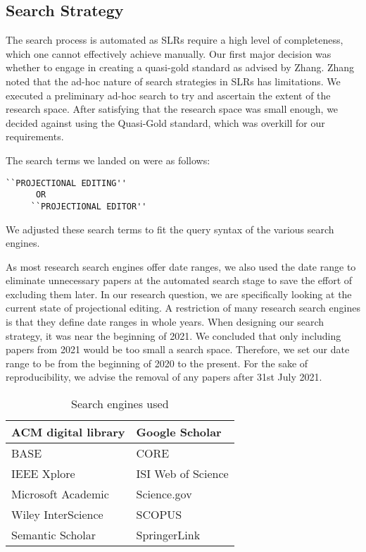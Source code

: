 \subsection{Search Strategy}

The search process is automated as SLRs require a high level of completeness, which one cannot effectively achieve manually.
Our first major decision was whether to engage in creating a quasi-gold standard as advised by Zhang\cite{Zhang_2011}.
Zhang noted that the ad-hoc nature of search strategies in SLRs has limitations.
We executed a preliminary ad-hoc search to try and ascertain the extent of the research space.
After satisfying that the research space was small enough, we decided against using the Quasi-Gold standard, which was overkill for our requirements.

The search terms we landed on were as follows:
\begin{lstlisting}[frame=none]
     ``PROJECTIONAL EDITING'' 
      OR 
     ``PROJECTIONAL EDITOR'' 
\end{lstlisting}

We adjusted these search terms to fit the query syntax of the various search engines.

As most research search engines offer date ranges, we also used the date range to eliminate unnecessary papers at the automated search stage to save the effort of excluding them later.
In our research question, we are specifically looking at the current state of projectional editing.
A restriction of many research search engines is that they define date ranges in whole years.
When designing our search strategy, it was near the beginning of 2021.
We concluded that only including papers from 2021 would be too small a search space. 
Therefore, we set our date range to be from the beginning of 2020 to the present.
For the sake of reproducibility, we advise the removal of any papers after 31st July 2021.

\begin{table}
    \begin{center}         
        \begin{tabular}{|l||l|}
            \hline
            ACM digital library       & Google Scholar       \\
            \hline
            BASE                      & CORE                 \\
            \hline  
            IEEE Xplore               & ISI Web of Science   \\
            \hline  
            Microsoft Academic        & Science.gov          \\
            \hline  
            Wiley InterScience        & SCOPUS               \\
            \hline  
            Semantic Scholar          & SpringerLink         \\
            \hline  
        \end{tabular}
    \end{center}
    \caption{Search engines used}
    \label{table:searchEngines}
\end{table}

